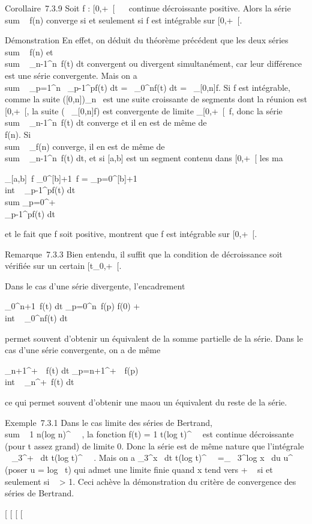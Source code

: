 \documentclass[]{article}
\begin{document}
Corollaire~7.3.9 Soit f : {[}0,+\infty~{[}\rightarrow~ ~ continue décroissante positive.
Alors la série \\sum ~
f(n) converge si et seulement si f est intégrable sur {[}0,+\infty~{[}.

Démonstration En effet, on déduit du théorème précédent que les deux
séries \\sum ~ f(n) et
\\sum ~
\int  \_n-1^n~f(t) dt convergent ou
divergent simultanément, car leur différence est une série convergente.
Mais on a \\sum ~
\_p=1^n\int ~
\_p-1^pf(t) dt =\int ~
\_0^nf(t) dt =\int ~
\_{[}0,n{]}f. Si f est intégrable, comme la suite
({[}0,n{]})\_n\in{}~ est une suite croissante de segments dont la
réunion est {[}0,+\infty~{[}, la suite (\int ~
\_{[}0,n{]}f) est convergente de limite
\int  \_{[}0,+\infty~{[}~f, donc la série
\\sum ~
\int  \_n-1^n~f(t) dt converge et
il en est de même de \\\sum
 f(n). Si \\sum ~
\_f(n) converge, il en est de même de
\\sum ~
\int  \_n-1^n~f(t) dt, et si
{[}a,b{]} est un segment contenu dans {[}0,+\infty~{[} les ma\jmathorations

\int  \_{[}a,b{]}~f
\leq\int  \_0^{[}b{]}+1~f =
\sum \_p=0^{[}b{]}+1~
\\int  ~
\_p-1^pf(t) dt \leq\\sum
\_p=0^+\infty~\\\int
  \_p-1^pf(t) dt

et le fait que f soit positive, montrent que f est intégrable sur
{[}0,+\infty~{[}.

Remarque~7.3.3 Bien entendu, il suffit que la condition de décroissance
soit vérifiée sur un certain {[}t\_0,+\infty~{[}.

Dans le cas d'une série divergente, l'encadrement

\int  \_0^n+1~f(t) dt
\leq\sum \_p=0^n~f(p) \leq f(0) +
\\int  ~
\_0^nf(t) dt

permet souvent d'obtenir un équivalent de la somme partielle de la
série. Dans le cas d'une série convergente, on a de même

\int  \_n+1^+\infty~~f(t) dt
\leq\sum \_p=n+1^+\infty~~f(p)
\leq\\int  ~
\_n^+\infty~f(t) dt

ce qui permet souvent d'obtenir une ma\jmathoration ou un équivalent du reste
de la série.

Exemple~7.3.1 Dans le cas limite des séries de Bertrand,
\\sum ~  1
\over n(log n)^\beta~~ ,
la fonction f(t) = 1 \over
t(log t)^\beta~~ est continue
décroissante (pour t assez grand) de limite 0. Donc la série est de même
nature que l'intégrale \int ~
\_3^+\infty~ dt \over
t(log t)^\beta~~ . Mais on a
\int  \_3^x~ dt
\over t(log t)^\beta~~
=\int  \_\log~
3^log x~ du \over
u^\beta~ (poser u = log~ t) qui admet
une limite finie quand x tend vers + \infty~ si et seulement si \beta~
\textgreater{} 1. Ceci achève la démonstration du critère de convergence
des séries de Bertrand.

{[}
{[}
{[}
{[}
\end{document}
